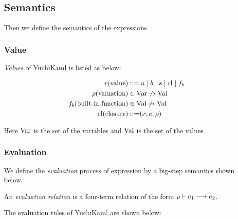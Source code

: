 
\subsection{Semantics}

Then we define the semantics of the expressions.

\subsubsection{Value}
\emph{Values} of YuchiKaml is listed as below:

\begin{align*}
    v (\text{value}) &\operatorname{:\!:=} n \mid b \mid  s \mid  \text{cl} \mid  f_b\\
    \rho  (\text{valuation}) &\in \text{Var} \not\to\text{Val} \\
    f_b{} (\text{built-in function})&\in \text{Val}\not\to\text{Val}\\
    \text{cl} (\text{closure}) &\operatorname{:\!:=} (x,e,\rho{})
\end{align*}

Here $\text{Var}$ is the set of the variables and $\text{Val}$ is the set of the values.

\subsubsection{Evaluation}
We define the \emph{evaluation} process of expression by a big-step semantics shown below.

An \emph{evaluation relation} is a four-term relation of the form $\rho \vdash e_1 \longrightarrow e_2$.

The evaluation rules of YuchiKaml are shown below:

{}

{}

{}

\infrule[E-AppCls]
{}{}


\infrule[E-AppBuiltIn]
{}{}


{}


{}


